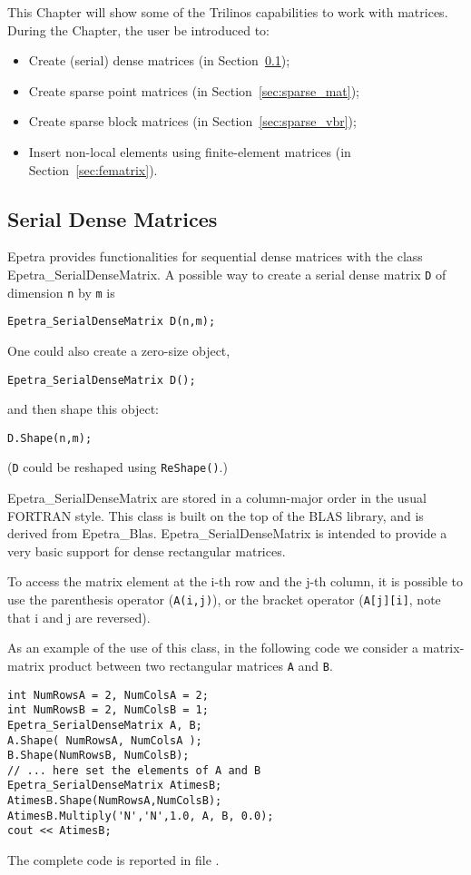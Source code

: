 This Chapter will show some of the Trilinos capabilities to work with
matrices. During the Chapter, the user be introduced to:
\begin{itemize}
\item Create (serial) dense matrices (in Section~\ref{sec:dense_mat});
\item Create sparse point matrices (in Section~\ref{sec:sparse_mat});
\item Create sparse block matrices (in Section~\ref{sec:sparse_vbr});
\item Insert non-local elements using finite-element matrices (in
  Section~\ref{sec:fematrix}).
\end{itemize}


\subsection{Serial Dense Matrices}
\label{sec:dense_mat}

Epetra provides functionalities for sequential dense matrices with the
class Epetra\_SerialDenseMatrix.  A possible way to create a serial
dense matrix \verb!D! of dimension \verb!n!  by \verb!m! is
\begin{verbatim}
Epetra_SerialDenseMatrix D(n,m);
\end{verbatim}
One could also create a zero-size object, 
\begin{verbatim}
Epetra_SerialDenseMatrix D();
\end{verbatim}
and then shape this object:
\begin{verbatim}
D.Shape(n,m);
\end{verbatim}
({\tt D} could be reshaped using \verb!ReShape()!.)

Epetra\_SerialDenseMatrix are stored in a column-major order in the
usual FORTRAN style. This class is built on the top of the BLAS
library, and is derived from Epetra\_Blas. Epetra\_SerialDenseMatrix is
intended to provide a very basic support for dense rectangular matrices.

\smallskip

To access the matrix element at the i-th row and the j-th column, it is
possible to use the parenthesis operator (\verb!A(i,j)!), or the bracket
operator (\verb!A[j][i]!, note that i and j are reversed).


As an example of the use of this class, in the following code we
consider a matrix-matrix product between two rectangular matrices
\verb!A! and \verb!B!. 
\begin{verbatim}
int NumRowsA = 2, NumColsA = 2;
int NumRowsB = 2, NumColsB = 1;
Epetra_SerialDenseMatrix A, B;
A.Shape( NumRowsA, NumColsA );
B.Shape(NumRowsB, NumColsB);
// ... here set the elements of A and B
Epetra_SerialDenseMatrix AtimesB;
AtimesB.Shape(NumRowsA,NumColsB);  
AtimesB.Multiply('N','N',1.0, A, B, 0.0);
cout << AtimesB;
\end{verbatim}
The complete code is reported in file
.


